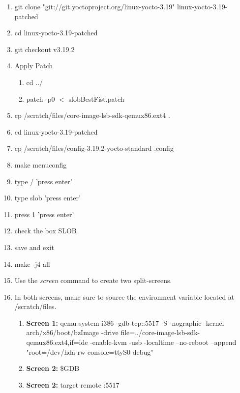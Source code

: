 \documentclass[draftclsnofoot, onecolumn, 10pt, compsoc]{IEEEtran}
\begin{document}
			\begin{enumerate}
				\item git clone "git://git.yoctoproject.org/linux-yocto-3.19" linux-yocto-3.19-patched
				
				\item cd linux-yocto-3.19-patched
				
				\item git checkout v3.19.2
				
				\item Apply Patch
				\begin{enumerate}
					\item cd ../
					\item patch -p0 $<$ slobBestFist.patch
				\end{enumerate}
				
				\item cp /scratch/files/core-image-lsb-sdk-qemux86.ext4 .
				\item cd linux-yocto-3.19-patched
				\item cp /scratch/files/config-3.19.2-yocto-standard .config
				\item make menuconfig
				
				\item type / 'press enter'
				\item type slob 'press enter'
				\item press 1 'press enter'
				\item check the box SLOB
				\item save and exit
				
				\item make -j4 all
				
				\item Use the \textit{screen} command to create two split-screens.
				
				\item In both screens, make sure to source the environment variable located at /scratch/files.
				\begin{enumerate}
					\item{\textbf{Screen 1:} qemu-system-i386 -gdb tcp::5517 -S -nographic -kernel arch/x86/boot/bzImage -drive file=../core-image-lsb-sdk-qemux86.ext4,if=ide -enable-kvm -usb -localtime --no-reboot --append "root=/dev/hda rw console=ttyS0 debug"}
					
					\item \textbf{Screen 2:} \$GDB
					
					\item \textbf{Screen 2:} target remote :5517
					

\end{enumerate}
\end{enumerate}
\end{document}
